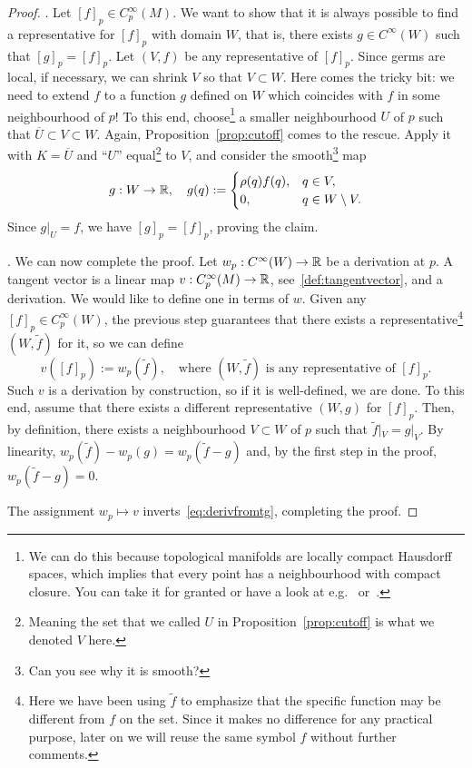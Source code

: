 \begin{proof}
  .
  Let $[f]_p\in C_p^\infty(M)$.
  We want to show that it is always possible to find a representative for $[f]_p$ with domain $W$, that is, there exists $g\in C^\infty(W)$ such that $[g]_p = [f]_p$.
  Let $(V, f)$ be any representative of $[f]_p$.
  Since germs are local, if necessary, we can shrink $V$ so that $V\subset W$.
  Here comes the tricky bit: we need to extend $f$ to a function $g$ defined on $W$ which coincides with $f$ in some neighbourhood of $p$!
  To this end, choose\footnote{We can do this because topological manifolds are locally compact Hausdorff spaces, which implies that every point has a neighbourhood with compact closure. You can take it for granted or have a look at e.g.~\cite[Lemma 4.65]{book:lee:topology} or~\cite{book:munkres:topology}.} a smaller neighbourhood $U$ of $p$ such that $\overline{U}\subset V\subset W$.
  Again, Proposition~\ref{prop:cutoff} comes to the rescue. Apply it with $K=\overline{U}$ and ``$U$'' equal\footnote{Meaning the set that we called $U$ in Proposition~\ref{prop:cutoff} is what we denoted $V$ here.} to $V$, and consider the smooth\footnote{Can you see why it is smooth?} map
  \begin{equation}
    g:W\to\mathbb{R}, \quad
    g(q) := \begin{cases}
      \rho(q)f(q), & q\in V,             \\
      0,           & q \in W\setminus V.
    \end{cases}
  \end{equation}
  Since $g|_U = f$, we have $[g]_p = [f]_p$, proving the claim.

  . We can now complete the proof.
  Let $w_p:C^\infty(W) \to\mathbb{R}$ be a derivation at $p$.
  A tangent vector is a linear map $v:C_p^\infty(M)\to\mathbb{R}$, see~\eqref{def:tangentvector}, and a derivation.
  We would like to define one in terms of $w$.
Given any $[f]_p\in C_p^\infty(W)$, the previous step guarantees that there exists a representative\footnote{Here we have been using $\widetilde{f}$ to emphasize that the specific function may be different from $f$ on the set. Since it makes no difference for any practical purpose, later on we will reuse the same symbol $f$ without further comments.} $(W,\widetilde{f})$ for it, so we can define
  \begin{equation}
    v([f]_p) := w_p(\widetilde{f}), \quad\mbox{where $(W,\widetilde{f})$ is any representative of $[f]_p$}.
  \end{equation}
  Such $v$ is a derivation by construction, so if it is well-defined, we are done.
  To this end, assume that there exists a different representative $(W, g)$ for $[f]_p$.
  Then, by definition, there exists a neighbourhood $V\subset W$ of $p$ such that $\widetilde{f}|_V = g|_V$.
  By linearity, $w_p(\widetilde{f}) - w_p(g) = w_p(\widetilde{f}-g)$ and, by the first step in the proof, $w_p(\widetilde{f}-g) = 0$.

  The assignment $w_p\mapsto v$ inverts~\eqref{eq:derivfromtg}, completing the proof.
\end{proof}

